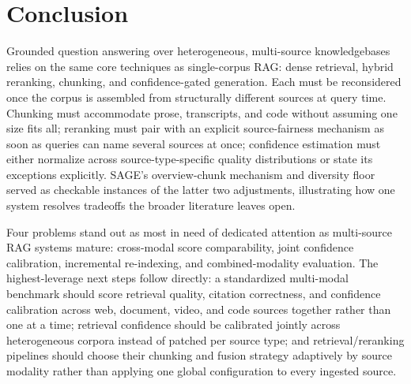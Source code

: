 \documentclass[conference]{IEEEtran}
\begin{document}
\section{Conclusion}
\label{sec:conclusion}

Grounded question answering over heterogeneous, multi-source knowledgebases relies on the same core techniques as single-corpus RAG: dense retrieval, hybrid reranking, chunking, and confidence-gated generation. Each must be reconsidered once the corpus is assembled from structurally different sources at query time. Chunking must accommodate prose, transcripts, and code without assuming one size fits all; reranking must pair with an explicit source-fairness mechanism as soon as queries can name several sources at once; confidence estimation must either normalize across source-type-specific quality distributions or state its exceptions explicitly. SAGE's overview-chunk mechanism and diversity floor served as checkable instances of the latter two adjustments, illustrating how one system resolves tradeoffs the broader literature leaves open.

Four problems stand out as most in need of dedicated attention as multi-source RAG systems mature: cross-modal score comparability, joint confidence calibration, incremental re-indexing, and combined-modality evaluation. The highest-leverage next steps follow directly: a standardized multi-modal benchmark should score retrieval quality, citation correctness, and confidence calibration across web, document, video, and code sources together rather than one at a time; retrieval confidence should be calibrated jointly across heterogeneous corpora instead of patched per source type; and retrieval/reranking pipelines should choose their chunking and fusion strategy adaptively by source modality rather than applying one global configuration to every ingested source.
\end{document}
